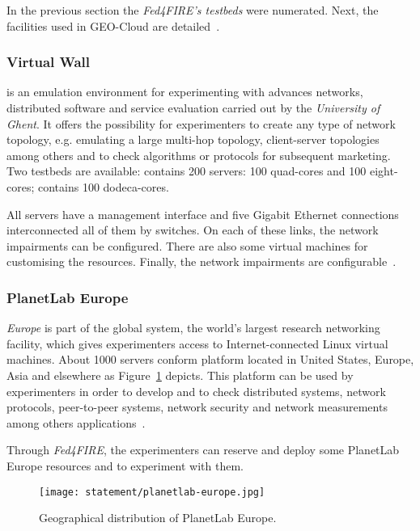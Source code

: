 In the previous section the \emph{Fed4FIRE's testbeds} were numerated. Next, the
facilities used in GEO-Cloud are detailed~\cite{referenciaFED4FIRE}.

\subsubsection{Virtual Wall}

\vw is an emulation environment for
experimenting with advances networks, distributed software and service
evaluation carried out by the \emph{University of Ghent}. It offers the possibility for experimenters to create any type of
network topology, e.g. emulating a large multi-hop topology, client-server
topologies among others and to check algorithms or protocols for subsequent
marketing.
Two \vw testbeds are available:  contains 200 servers: 100
quad-cores and 100 eight-cores;  contains 100 dodeca-cores.

All servers have a management interface and five Gigabit Ethernet connections
interconnected all of them by switches. On each of these links, the network
impairments can be configured. There are also some virtual machines for
customising the resources. Finally, the network
impairments are configurable~\cite{VIRTUALWALL}.

\subsubsection{PlanetLab Europe}

\pl \emph{Europe} is part of the \pl global system, the world's largest
research networking facility, which gives experimenters access to
Internet-connected Linux virtual machines. About 1000 servers conform \pl
platform located in United States, Europe, Asia and elsewhere as Figure~\ref{fig:intr-planetlab-europe} depicts.
This platform can be used by experimenters in order to develop and to check
distributed systems, network protocols, peer-to-peer systems, network security
and network measurements among others applications~\cite{PLANETLAB}.

Through \emph{Fed4FIRE}, the experimenters can reserve and deploy some
PlanetLab Europe resources and to experiment with them.

\begin{figure}[!h]
\begin{center}
\texttt{[image: statement/planetlab-europe.jpg]}
\caption{Geographical distribution of PlanetLab Europe.}
\label{fig:intr-planetlab-europe}
\end{center}
\end{figure}

